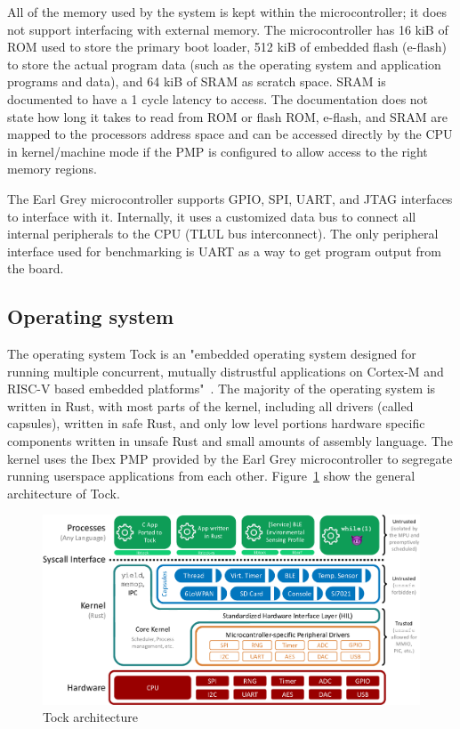 \documentclass{article}
\begin{document}
All of the memory used by the system is kept within the microcontroller; it does not support interfacing with external memory. The microcontroller has 16 kiB of ROM used to store the primary boot loader, 512 kiB of embedded flash (e-flash) to store the actual program data (such as the operating system and application programs and data), and 64 kiB of SRAM as scratch space. SRAM is documented to have a 1 cycle latency to access. The documentation does not state how long it takes to read from ROM or flash ROM, e-flash, and SRAM are mapped to the processors address space and can be accessed directly by the CPU in kernel/machine mode if the PMP is configured to allow access to the right memory regions.

The Earl Grey microcontroller supports GPIO, SPI, UART, and JTAG interfaces to interface with it. Internally, it uses a customized data bus to connect all internal peripherals to the CPU (TLUL bus interconnect). The only peripheral interface used for benchmarking is UART as a way to get program output from the board.

\subsection{Operating system}

The operating system Tock is an "embedded operating system designed for running multiple concurrent, mutually distrustful applications on Cortex-M and RISC-V based embedded platforms"~\cite{tockgithub}. The majority of the operating system is written in Rust, with most parts of the kernel, including all drivers (called capsules), written in safe Rust, and only low level portions hardware specific components written in unsafe Rust and small amounts of assembly language. The kernel uses the Ibex PMP provided by the Earl Grey microcontroller to segregate running userspace applications from each other. Figure~\ref{fig:tock-arch} show the general architecture of Tock.

\begin{figure}[htp]
    \centering
    \includegraphics[width=\textwidth]{tock-stack.png}
    \caption{Tock architecture\cite{tockgithub-arch}}
    \label{fig:tock-arch}
\end{figure}
\end{document}
